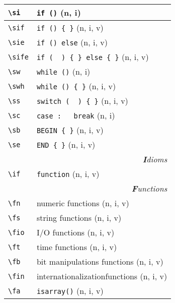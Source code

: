\documentclass[oneside,10pt,landscape,DIV16]{scrartcl}
\begin{document}
\begin{multicols}{3}
\begin{center}
\begin{tabular}[]{|p{11mm}|p{60mm}|}
\hline \verb'\si'      & \verb'if ()'                 \hfill (n, i)\\
\hline \verb'\sif'     & \verb'if () { }'             \hfill (n, i, v)\\
\hline \verb'\sie'     & \verb'if () else'            \hfill (n, i, v)\\
\hline \verb'\sife'    & \verb'if (  ) { } else { }'  \hfill (n, i, v)\\
\hline \verb'\sw'      & \verb'while ()'              \hfill (n, i)\\
\hline \verb'\swh'     & \verb'while () { }'          \hfill (n, i, v)\\
\hline \verb'\ss'      & \verb'switch (  ) { }'       \hfill (n, i, v)\\
\hline \verb'\sc'      & \verb'case :	break'          \hfill (n, i)\\
\hline \verb'\sb'      & \verb'BEGIN { }'             \hfill (n, i, v)\\
\hline \verb'\se'      & \verb'END { }'               \hfill (n, i, v)\\
\hline
\hline
\multicolumn{2}{|r|}{\textsl{\textbf{I}dioms}}                 \\[1.0ex]
\hline \verb'\if' & \verb'function'            \hfill (n, i, v)\\
\hline
\hline
\hline
\multicolumn{2}{|r|}{\textsl{\textbf{F}unctions}}              \\[1.0ex]
\hline \verb'\fn ' & numeric functions                       \hfill (n, i, v)\\
\hline \verb'\fs ' & string functions                        \hfill (n, i, v)\\
\hline \verb'\fio' & I/O functions                           \hfill (n, i, v)\\
\hline \verb'\ft ' & time functions                          \hfill (n, i, v)\\
\hline \verb'\fb ' & bit manipulations functions             \hfill (n, i, v)\\
\hline \verb'\fin' & internationalizationfunctions           \hfill (n, i, v)\\
\hline \verb'\fa ' & \texttt{isarray()}                      \hfill (n, i, v)\\

\end{tabular}
\end{center}
\end{multicols}
\end{document}
